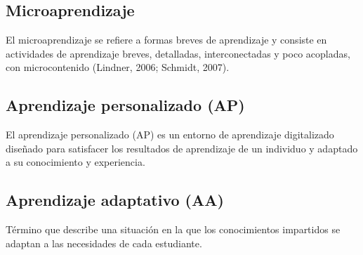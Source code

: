 
\subsection{Microaprendizaje}
El microaprendizaje se refiere a formas breves de aprendizaje y consiste en
actividades de aprendizaje breves, detalladas, interconectadas y poco acopladas,
con microcontenido (Lindner, 2006; Schmidt, 2007).
\cite{article:microlearning_buchem}

\subsection{Aprendizaje personalizado (AP)}
El aprendizaje personalizado (AP) es un entorno de aprendizaje digitalizado
diseñado para satisfacer los resultados de aprendizaje de un individuo y
adaptado a su conocimiento y experiencia.
\cite{article:elearning_future_trends_shahid}

\subsection{Aprendizaje adaptativo (AA)}
Término que describe una situación en la que los conocimientos impartidos se
adaptan a las necesidades de cada estudiante.
\cite{article:elearning_future_trends_shahid}